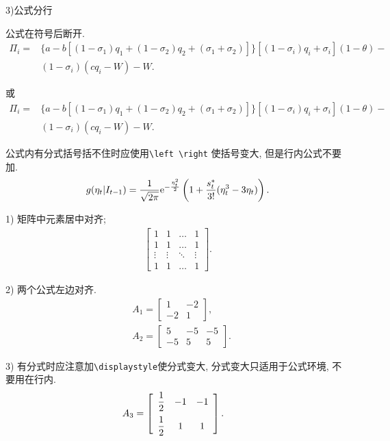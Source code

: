 \documentclass{setp-new}
\begin{document}
3)公式分行

 公式在符号后断开.
\begin{equation}
\begin{aligned}
\Pi_i = & \{ a - b[ ( 1 - \sigma_{1}
)q_{1} +( 1 -\sigma_{2} )q_{2} +
(\sigma _{1} +\sigma_{2} ) ]
\}[ ( 1 -\sigma_{i} )q_{i} + \sigma
_{i} ]( 1 - \theta  )-\\& ( 1 -
\sigma _{i} )(cq_{i} - W ) - W.
\end{aligned}\end{equation}

或
\begin{align}
\Pi_i = & \{ a - b[ ( 1 - \sigma_{1}
)q_{1} +( 1 -\sigma_{2} )q_{2} +
(\sigma _{1} +\sigma_{2} ) ]
\}[ ( 1 -\sigma_{i} )q_{i} + \sigma
_{i} ]( 1 - \theta  )-\\& ( 1 -
\sigma _{i} )(cq_{i} - W ) - W.
\end{align}

 公式内有分式括号括不住时应使用\verb|\left \right| 使括号变大, 但是行内公式不要加.
\begin{align}
g( \eta_{t}| I_{t-1} )=\frac{1}{\sqrt{2\pi }}{{\rm e}^{-\frac{\eta _{t}^{2}}{2}}}\left( 1+\frac{s_{t}^{*}}{3!}( \eta _{t}^{3}-3{\eta _{t}} ) \right).
\end{align}



1) 矩阵中元素居中对齐;
\begin{align}
\left[\begin{array}{cccc}
1& 1 &\dots &1\\
1& 1&\dots &1\\
\vdots&\vdots& \ddots   &\vdots\\
1& 1&\dots &1
\end{array}\right].\end{align}


2) 两个公式左边对齐.
\begin{align}
&A_1=\left[\begin{array}{cc} 1& -2\\-2 &1
\end{array}\right],\\
&A_2=\left[\begin{array}{ccc} 5&-5&-5\\-5&5 &5
\end{array}\right].
\end{align}

3) 有分式时应注意加\verb|\displaystyle|使分式变大, 分式变大只适用于公式环境, 不要用在行内.
\begin{align}
&A_3=\left[\begin{array}{ccc}\vspace{2mm} \displaystyle\frac{1}{2}&-1&-1\\ \displaystyle\frac{1}{2} &1 &1
\end{array}\right].
\end{align}
\end{document}
